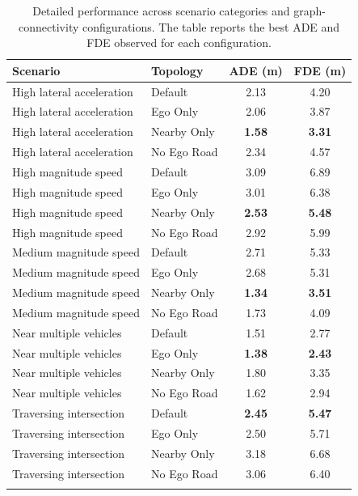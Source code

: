 \begin{table}
\caption{Detailed performance across scenario categories and graph-connectivity configurations. The table reports the best ADE and FDE observed for each configuration.\label{tab:chapter_detailed_topology_results}}{%
\begin{tabular}{@{}llcc@{}}
\toprule
\textbf{Scenario} & \textbf{Topology} & \textbf{ADE (m)} & \textbf{FDE (m)} \\
\midrule
High lateral acceleration & Default & 2.13 & 4.20 \\
High lateral acceleration & Ego Only & 2.06 & 3.87 \\
High lateral acceleration & Nearby Only & \textbf{1.58} & \textbf{3.31} \\
High lateral acceleration & No Ego Road & 2.34 & 4.57 \\
\midrule
High magnitude speed & Default & 3.09 & 6.89 \\
High magnitude speed & Ego Only & 3.01 & 6.38 \\
High magnitude speed & Nearby Only & \textbf{2.53} & \textbf{5.48} \\
High magnitude speed & No Ego Road & 2.92 & 5.99 \\
\midrule
Medium magnitude speed & Default & 2.71 & 5.33 \\
Medium magnitude speed & Ego Only & 2.68 & 5.31 \\
Medium magnitude speed & Nearby Only & \textbf{1.34} & \textbf{3.51} \\
Medium magnitude speed & No Ego Road & 1.73 & 4.09 \\
\midrule
Near multiple vehicles & Default & 1.51 & 2.77 \\
Near multiple vehicles & Ego Only & \textbf{1.38} & \textbf{2.43} \\
Near multiple vehicles & Nearby Only & 1.80 & 3.35 \\
Near multiple vehicles & No Ego Road & 1.62 & 2.94 \\
\midrule
Traversing intersection & Default & \textbf{2.45} & \textbf{5.47} \\
Traversing intersection & Ego Only & 2.50 & 5.71 \\
Traversing intersection & Nearby Only & 3.18 & 6.68 \\
Traversing intersection & No Ego Road & 3.06 & 6.40 \\
\botrule
\end{tabular}}{}
\end{table}

